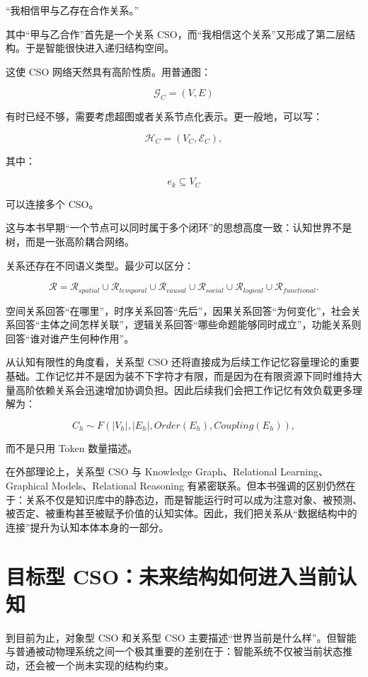 “我相信甲与乙存在合作关系。”

其中“甲与乙合作”首先是一个关系 CSO，而“我相信这个关系”又形成了第二层结构。于是智能很快进入递归结构空间。

这使 CSO 网络天然具有高阶性质。用普通图：

\[
\mathcal G_C=(V,E)
\]

有时已经不够，需要考虑超图或者关系节点化表示。更一般地，可以写：

\[
\mathcal H_C
=
(V_C,\mathcal E_C),
\]

其中：

\[
e_k
\subseteq
V_C
\]

可以连接多个 CSO。

这与本书早期“一个节点可以同时属于多个闭环”的思想高度一致：认知世界不是树，而是一张高阶耦合网络。

关系还存在不同语义类型。最少可以区分：

\[
\mathcal R
=
\mathcal R_{spatial}
\cup
\mathcal R_{temporal}
\cup
\mathcal R_{causal}
\cup
\mathcal R_{social}
\cup
\mathcal R_{logical}
\cup
\mathcal R_{functional}.
\]

空间关系回答“在哪里”，时序关系回答“先后”，因果关系回答“为何变化”，社会关系回答“主体之间怎样关联”，逻辑关系回答“哪些命题能够同时成立”，功能关系则回答“谁对谁产生何种作用”。

从认知有限性的角度看，关系型 CSO 还将直接成为后续工作记忆容量理论的重要基础。工作记忆并不是因为装不下字符才有限，而是因为在有限资源下同时维持大量高阶依赖关系会迅速增加协调负担。因此后续我们会把工作记忆有效负载更多理解为：

\[
C_h
\sim
F(
|V_h|,
|E_h|,
Order(E_h),
Coupling(E_h)
),
\]

而不是只用 Token 数量描述。

在外部理论上，关系型 CSO 与 Knowledge Graph、Relational Learning、Graphical Models、Relational Reasoning 有紧密联系。但本书强调的区别仍然在于：关系不仅是知识库中的静态边，而是智能运行时可以成为注意对象、被预测、被否定、被重构甚至被赋予价值的认知实体。因此，我们把关系从“数据结构中的连接”提升为认知本体本身的一部分。


\section{目标型 CSO：未来结构如何进入当前认知}

到目前为止，对象型 CSO 和关系型 CSO 主要描述“世界当前是什么样”。但智能与普通被动物理系统之间一个极其重要的差别在于：智能系统不仅被当前状态推动，还会被一个尚未实现的结构约束。

